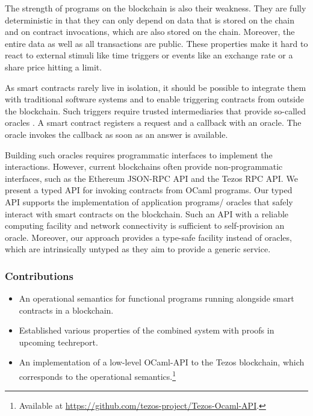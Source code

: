 \documentclass[runningheads]{llncs}
\begin{document}
The strength of programs on the blockchain is also their
weakness. They are fully deterministic in that they can only depend on
data that is stored on the chain and on contract invocations, which are
also stored on the chain. Moreover, the entire data as well as all
transactions are public. These properties make it hard to react to
external stimuli like time triggers or events like an exchange rate or
a share price hitting a limit. 

As smart contracts rarely live in isolation, it should be possible to
integrate them with traditional software systems and to enable
triggering contracts from outside the blockchain. Such triggers
require trusted intermediaries that provide so-called oracles \cite{oracle-patterns,call-action-oracle}. A
smart contract registers a request and a callback with an oracle. The
oracle invokes the callback as soon as an answer is available. 

Building such oracles requires programmatic interfaces to implement the interactions. 
However, current blockchains often provide non-programmatic interfaces, 
such as the Ethereum JSON-RPC API and the Tezos RPC API. 
We present a typed API for invoking contracts from OCaml programs. 
Our typed API supports the implementation of application programs/ oracles 
that safely interact with smart contracts on the blockchain. 
Such an API with a reliable computing facility and network 
connectivity is sufficient to self-provision an oracle.
 Moreover, our approach provides a type-safe facility instead of oracles, which are intrinsically untyped as they aim to provide a generic service.

\subsubsection{Contributions}
\label{sec:contributions}

\begin{itemize}
\item An operational semantics for functional programs running
  alongside smart contracts in a blockchain. 
\item Established various properties of the combined system with
  proofs in upcoming techreport.
\item An implementation of a low-level OCaml-API to the Tezos
  blockchain, which corresponds to the operational semantics.\footnote{%
    Available at \url{https://github.com/tezos-project/Tezos-Ocaml-API}.}
\end{itemize}
\end{document}
